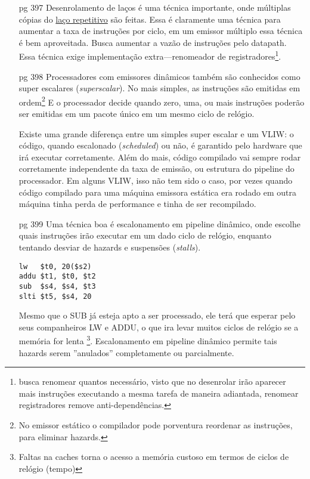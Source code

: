 \documentclass{article}
\begin{document}
\begin{enumerate}
\item[pg 397] Desenrolamento de laços é uma técnica importante, onde múltiplas
cópias do \underline{laço repetitivo} são feitas. Essa é claramente uma técnica
para aumentar a taxa de instruções por ciclo, em um emissor múltiplo essa
técnica é bem aproveitada. Busca aumentar a vazão de instruções pelo datapath.
Essa técnica exige implementação extra---renomeador de
registradores\footnote{busca renomear quantos necessário, visto que no
desenrolar irão aparecer mais instruções executando a mesma tarefa de maneira
adiantada, renomear registradores remove anti-dependências.}.

\item[pg 398] Processadores com emissores dinâmicos também são conhecidos como 
super escalares (\textit{superscalar}). No mais simples, as instruções são 
emitidas em ordem\footnote{No emissor estático o compilador pode porventura 
reordenar as instruções, para eliminar hazards.} E o processador decide quando 
zero, uma, ou mais instruções poderão ser emitidas em um pacote único em um 
mesmo ciclo de relógio.

Existe uma grande diferença entre um simples super escalar e um VLIW: o código, 
quando escalonado (\textit{scheduled}) ou não, é garantido pelo hardware que 
irá executar corretamente. Além do mais, código compilado vai sempre rodar 
corretamente independente da taxa de emissão, ou estrutura do pipeline do 
processador. Em alguns VLIW, isso não tem sido o caso, por vezes quando código 
compilado para uma máquina emissora estática era rodado em outra máquina tinha 
perda de performance e tinha de ser recompilado.

\item[pg 399] Uma técnica boa é escalonamento em pipeline dinâmico, onde 
escolhe quais instruções irão executar em um dado ciclo de relógio, enquanto 
tentando desviar de hazards e suspensões (\textit{stalls}).

\begin{verbatim}
lw   $t0, 20($s2)
addu $t1, $t0, $t2
sub  $s4, $s4, $t3
slti $t5, $s4, 20
\end{verbatim}

Mesmo que o SUB já esteja apto a ser processado, ele terá que esperar pelo seus 
companheiros LW e ADDU, o que ira levar muitos ciclos de relógio se a memória 
for lenta \footnote{Faltas na caches torna o acesso a memória custoso em termos 
de ciclos de relógio (tempo)}. Escalonamento em pipeline dinâmico permite tais 
hazards serem ''anulados'' completamente ou parcialmente.


\end{enumerate}
\end{document}
